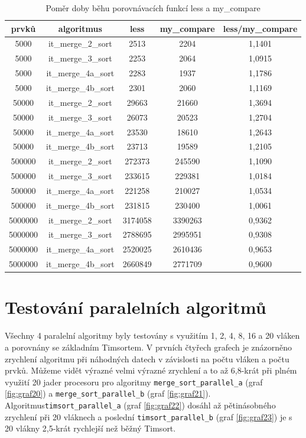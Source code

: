 \documentclass[thesis=B,czech]{FITthesis}[2019/12/23]
\begin{document}
 \begin{table}[htbp]\centering
 	\caption[Poměr doby běhu porovnávacích funkcí less a my\_compare]{Poměr doby běhu porovnávacích funkcí less a my\_compare}\label{tab:tab4}
 	\begin{tabular}{|c|c|c|c|c|}\hline
 		prvků		& algoritmus		& less	& my\_compare & less/my\_compare	\tabularnewline \hline \hline
5000 & it\_merge\_2\_sort & 2513 & 2204 & 1,1401 \tabularnewline \hline
5000 & it\_merge\_3\_sort & 2253 & 2064 & 1,0915 \tabularnewline \hline
5000 & it\_merge\_4a\_sort & 2283 & 1937 & 1,1786 \tabularnewline \hline
5000 & it\_merge\_4b\_sort & 2301 & 2060 & 1,1169 \tabularnewline \hline
50000 & it\_merge\_2\_sort & 29663 & 21660 & 1,3694 \tabularnewline \hline
50000 & it\_merge\_3\_sort & 26073 & 20523 & 1,2704 \tabularnewline \hline
50000 & it\_merge\_4a\_sort & 23530 & 18610 & 1,2643 \tabularnewline \hline
50000 & it\_merge\_4b\_sort & 23713 & 19589 & 1,2105 \tabularnewline \hline
500000 & it\_merge\_2\_sort & 272373 & 245590 & 1,1090 \tabularnewline \hline
500000 & it\_merge\_3\_sort & 233615 & 229381 & 1,0184 \tabularnewline \hline
500000 & it\_merge\_4a\_sort & 221258 & 210027 & 1,0534 \tabularnewline \hline
500000 & it\_merge\_4b\_sort & 231815 & 230400 & 1,0061 \tabularnewline \hline
5000000 & it\_merge\_2\_sort & 3174058 & 3390263 & 0,9362 \tabularnewline \hline
5000000 & it\_merge\_3\_sort & 2788695 & 2995951 & 0,9308 \tabularnewline \hline
5000000 & it\_merge\_4a\_sort & 2520025 & 2610436 & 0,9653 \tabularnewline \hline
5000000 & it\_merge\_4b\_sort & 2660849 & 2771709 & 0,9600 \tabularnewline \hline


	\end{tabular}
\end{table}

\section{Testování paralelních algoritmů}

Všechny 4 paralelní algoritmy byly testovány s využitím 1, 2, 4, 8, 16 a 20 vláken a porovnány se základním Timsortem. V prvních čtyřech grafech je znázorněno zrychlení algoritmu při náhodných datech v závislosti na počtu vláken a počtu prvků. Můžeme vidět výrazné velmi výrazné zrychlení a to až 6,8-krát při plném využití 20 jader procesoru pro algoritmy \texttt{merge\_sort\_parallel\_a} (graf \ref{fig:graf20}) a \texttt{merge\_sort\_parallel\_b} (graf \ref{fig:graf21}). Algoritmus\linebreak \texttt{timsort\_parallel\_a} (graf \ref{fig:graf22}) dosáhl až pětinásobného zrychlení při 20 vláknech a poslední \texttt{timsort\_parallel\_b} (graf \ref{fig:graf23}) je s 20 vlákny 2,5-krát rychlejší než běžný Timsort.
\end{document}
